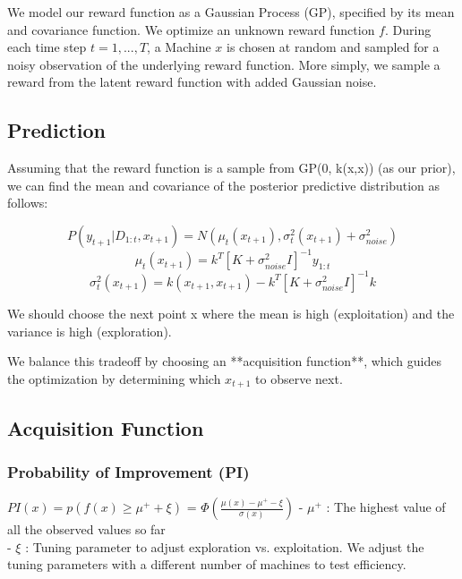 \documentclass{article}
\begin{document}
We model our reward function as a Gaussian Process (GP), specified by its mean and covariance function. We optimize an unknown reward function $f$. During each time step $t = 1,...,T$, a Machine $x$ is chosen at random and sampled for a noisy observation of the underlying reward function. More simply, we sample a reward from the latent reward function with added Gaussian noise.\\

\subsection{Prediction}

Assuming that the reward function is a sample from GP(0, k(x,x)) (as our prior), we can find the mean and covariance of the posterior predictive distribution as follows:

$$P(y_{t+1} | D_{1:t}, x_{t+1}) = N(\mu_t(x_{t+1}), \sigma_t^2(x_{t+1}) + \sigma_{noise}^2)$$
$$\mu_t(x_{t+1}) = k^T[K + \sigma_{noise}^2I]^{-1}y_{1:t}$$
$$\sigma_t^2(x_{t+1}) = k(x_{t+1}, x_{t+1}) - k^T[K + \sigma_{noise}^2I]^{-1}k$$

We should choose the next point x where the mean is high (exploitation) and the variance is high (exploration).

We balance this tradeoff by choosing an **acquisition function**, which guides the optimization by determining which $x_{t+1}$ to observe next.

\subsection{Acquisition Function}

\subsubsection{Probability of Improvement (PI)}

$PI(x) = p(f(x) \geq \mu^+ + \xi)$ = $\Phi(\frac{\mu(x) - \mu^+ - \xi}{\sigma(x)})$
- $\mu^+$ : The highest value of all the observed values so far\\
- $\xi$ : Tuning parameter to adjust exploration vs. exploitation. We adjust the tuning parameters with a different number of machines to test efficiency.
\end{document}
